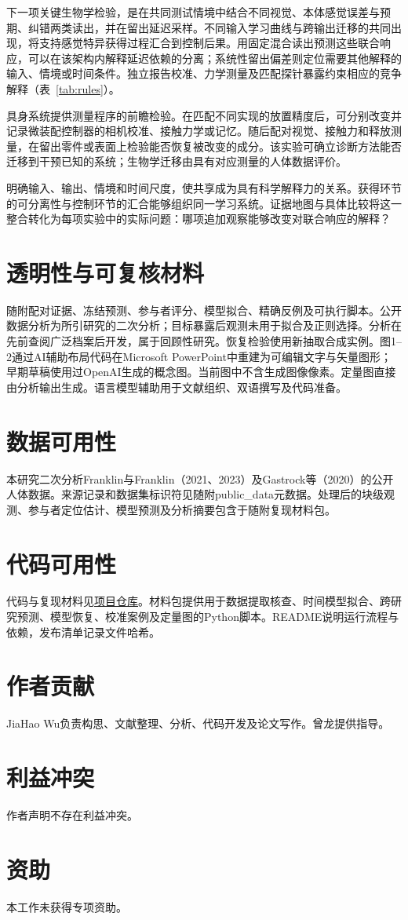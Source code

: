 \documentclass[11pt,a4paper]{article}
\begin{document}
下一项关键生物学检验，是在共同测试情境中结合不同视觉、本体感觉误差与预期、纠错两类读出，并在留出延迟采样。不同输入学习曲线与跨输出迁移的共同出现，将支持感觉特异获得过程汇合到控制后果。用固定混合读出预测这些联合响应，可以在该架构内解释延迟依赖的分离；系统性留出偏差则定位需要其他解释的输入、情境或时间条件。独立报告校准、力学测量及匹配探针暴露约束相应的竞争解释（表~\ref{tab:rules}）。

具身系统提供测量程序的前瞻检验。在匹配不同实现的放置精度后，可分别改变并记录微装配控制器的相机校准、接触力学或记忆。随后配对视觉、接触力和释放测量，在留出零件或表面上检验能否恢复被改变的成分。该实验可确立诊断方法能否迁移到干预已知的系统；生物学迁移由具有对应测量的人体数据评价。

明确输入、输出、情境和时间尺度，使共享成为具有科学解释力的关系。获得环节的可分离性与控制环节的汇合能够组织同一学习系统。证据地图与具体比较将这一整合转化为每项实验中的实际问题：哪项追加观察能够改变对联合响应的解释？

\section{透明性与可复核材料}
随附配对证据、冻结预测、参与者评分、模型拟合、精确反例及可执行脚本。公开数据分析为所引研究的二次分析；目标暴露后观测未用于拟合及正则选择。分析在先前查阅广泛档案后开发，属于回顾性研究。恢复检验使用新抽取合成实例。图1--2通过AI辅助布局代码在Microsoft PowerPoint中重建为可编辑文字与矢量图形；早期草稿使用过OpenAI生成的概念图。当前图中不含生成图像像素。定量图直接由分析输出生成。语言模型辅助用于文献组织、双语撰写及代码准备。
\section{数据可用性}
本研究二次分析Franklin与Franklin（2021、2023）及Gastrock等（2020）的公开人体数据。来源记录和数据集标识符见随附public\_data元数据。处理后的块级观测、参与者定位估计、模型预测及分析摘要包含于随附复现材料包。\cite{franklin2021,franklin2023,external2020}
\section{代码可用性}
代码与复现材料见\href{https://github.com/WUJIAHAO-HKU/Shared-and-separable-motor-learning-reconciling-transfer-dissociation-and-error-attribution}{项目仓库}。材料包提供用于数据提取核查、时间模型拟合、跨研究预测、模型恢复、校准案例及定量图的Python脚本。README说明运行流程与依赖，发布清单记录文件哈希。
\section{作者贡献}
JiaHao Wu负责构思、文献整理、分析、代码开发及论文写作。曾龙提供指导。
\section{利益冲突}
作者声明不存在利益冲突。
\section{资助}
本工作未获得专项资助。

\begingroup\fontsize{8.5}{9.6}\selectfont\setlength{\parskip}{0pt}\setlength{\bibsep}{0pt}\endgroup
\end{document}
